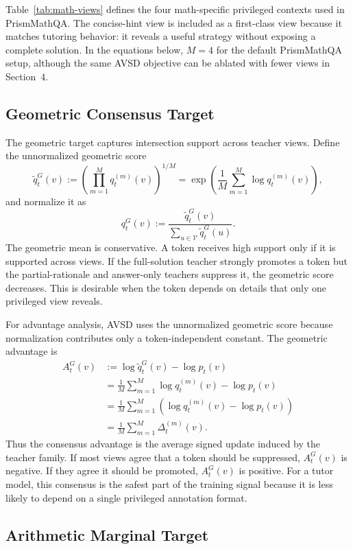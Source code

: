 Table~\ref{tab:math-views} defines the four math-specific privileged contexts used in PrismMathQA. The concise-hint view is included as a first-class view because it matches tutoring behavior: it reveals a useful strategy without exposing a complete solution. In the equations below, $M=4$ for the default PrismMathQA setup, although the same AVSD objective can be ablated with fewer views in Section~4.

\subsection{Geometric Consensus Target}

The geometric target captures intersection support across teacher views. Define the unnormalized geometric score
\[
    \widetilde{q}_t^G(v)
    := \left(\prod_{m=1}^{M}q_t^{(m)}(v)\right)^{1/M}
    = \exp\left(\frac{1}{M}\sum_{m=1}^{M}\log q_t^{(m)}(v)\right),
\]
and normalize it as
\[
    q_t^G(v)
    := \frac{\widetilde{q}_t^G(v)}
    {\sum_{u\in\mathcal{V}}\widetilde{q}_t^G(u)}.
\]
The geometric mean is conservative. A token receives high support only if it is supported across views. If the full-solution teacher strongly promotes a token but the partial-rationale and answer-only teachers suppress it, the geometric score decreases. This is desirable when the token depends on details that only one privileged view reveals.

For advantage analysis, AVSD uses the unnormalized geometric score because normalization contributes only a token-independent constant. The geometric advantage is
\[
\begin{aligned}
    A_t^G(v)
    &:= \log \widetilde{q}_t^G(v)-\log p_t(v)\\
    &= \frac{1}{M}\sum_{m=1}^{M}\log q_t^{(m)}(v)-\log p_t(v)\\
    &= \frac{1}{M}\sum_{m=1}^{M}
       \left(\log q_t^{(m)}(v)-\log p_t(v)\right)\\
    &= \frac{1}{M}\sum_{m=1}^{M}\Delta_t^{(m)}(v).
\end{aligned}
\]
Thus the consensus advantage is the average signed update induced by the teacher family. If most views agree that a token should be suppressed, $A_t^G(v)$ is negative. If they agree it should be promoted, $A_t^G(v)$ is positive. For a tutor model, this consensus is the safest part of the training signal because it is less likely to depend on a single privileged annotation format.

\subsection{Arithmetic Marginal Target}

